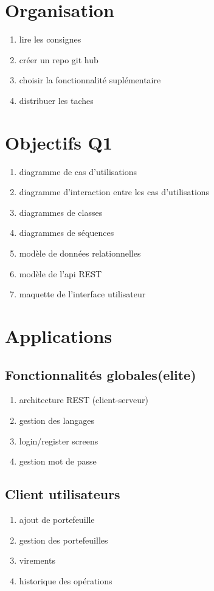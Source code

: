 \documentclass{article}
\begin{document}
\section{Organisation}

\begin{enumerate}
	\item{lire les consignes}
	\item{créer un repo git hub}
	\item{choisir la fonctionnalité suplémentaire}
	\item{distribuer les taches}
\end{enumerate}

\section{Objectifs Q1}

\begin{enumerate}
	\item{diagramme de cas d'utilisations}
	\item{diagramme d'interaction entre les cas d'utilisations}
	\item{diagrammes de classes}
	\item{diagrammes de séquences}
	\item{modèle de données relationnelles}
	\item{modèle de l'api REST}
	\item{maquette de l'interface utilisateur}
\end{enumerate}

\section{Applications}

\subsection{Fonctionnalités globales(elite)}
\begin{enumerate}
	\item{architecture REST (client-serveur)}
	\item{gestion des langages}
	\item{login/register screens}
	\item{gestion mot de passe}
\end{enumerate}

\subsection{Client utilisateurs}
\begin{enumerate}
	\item{ajout de portefeuille}
	\item{gestion des portefeuilles}
	\item{virements}
	\item{historique des opérations}
\end{enumerate}
\end{document}
